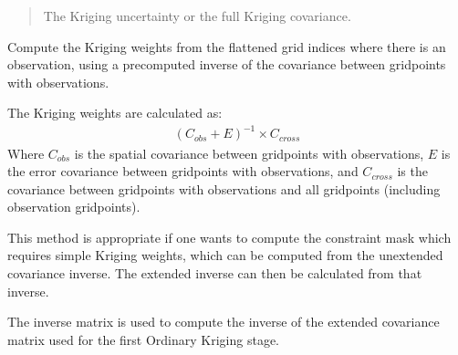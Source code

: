 \documentclass[letterpaper,10pt,english]{sphinxmanual}
\begin{document}
\begin{fulllineitems}
\begin{fulllineitems}
\begin{quote}
\begin{description}
\sphinxAtStartPar
{} \textendash{} The Kriging uncertainty or the full Kriging covariance.

\sphinxAtStartPar
{}

\end{description}\end{quote}

\end{fulllineitems}


\begin{fulllineitems}
\label{\detokenize{kriging:glomar_gridding.stochastic.StochasticKriging.kriging_weights_from_inverse}}
\pysigstartsignatures
\pysiglinewithargsret
{}
{}
{}
\pysigstopsignatures
\sphinxAtStartPar
Compute the Kriging weights from the flattened grid indices where
there is an observation, using a pre\sphinxhyphen{}computed inverse of the covariance
between grid\sphinxhyphen{}points with observations.

\sphinxAtStartPar
The Kriging weights are calculated as:
\begin{equation*}
\begin{split}(C_{obs} + E)^{-1} \times C_{cross}\end{split}
\end{equation*}
\sphinxAtStartPar
Where \(C_{obs}\) is the spatial covariance between grid\sphinxhyphen{}points
with observations, \(E\) is the error covariance between grid\sphinxhyphen{}points
with observations, and \(C_{cross}\) is the covariance between
grid\sphinxhyphen{}points with observations and all grid\sphinxhyphen{}points (including observation
grid\sphinxhyphen{}points).

\sphinxAtStartPar
This method is appropriate if one wants to compute the constraint mask
which requires simple Kriging weights, which can be computed from the
unextended covariance inverse. The extended inverse can then be
calculated from that inverse.

\sphinxAtStartPar
The inverse matrix is used to compute the inverse of the extended
covariance matrix used for the first Ordinary Kriging stage.


\end{fulllineitems}
\end{fulllineitems}
\end{document}

